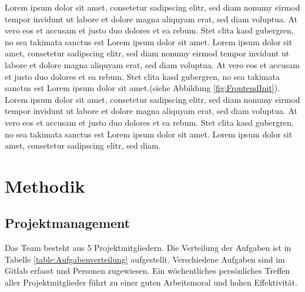 \documentclass[a4paper]{spie}  %
\begin{document}
Lorem ipsum dolor sit amet, consetetur sadipscing elitr, sed diam nonumy eirmod tempor invidunt ut labore et dolore magna aliquyam erat, sed diam voluptua. At vero eos et accusam et justo duo dolores et ea rebum. Stet clita kasd gubergren, no sea takimata sanctus est Lorem ipsum dolor sit amet. Lorem ipsum dolor sit amet, consetetur sadipscing elitr, sed diam nonumy eirmod tempor invidunt ut labore et dolore magna aliquyam erat, sed diam voluptua. At vero eos et accusam et justo duo dolores et ea rebum. Stet clita kasd gubergren, no sea takimata sanctus est Lorem ipsum dolor sit amet.(siehe Abbildung \ref{fig:FrontendInit}).
\\
Lorem ipsum dolor sit amet, consetetur sadipscing elitr, sed diam nonumy eirmod tempor invidunt ut labore et dolore magna aliquyam erat, sed diam voluptua. At vero eos et accusam et justo duo dolores et ea rebum. Stet clita kasd gubergren, no sea takimata sanctus est Lorem ipsum dolor sit amet. Lorem ipsum dolor sit amet, consetetur sadipscing elitr, sed diam.

\section{Methodik}
\subsection{Projektmanagement}
Das Team besteht aus 5 Projektmitgliedern. Die Verteilung der Aufgaben ist in Tabelle \ref{table:Aufgabenverteilung} aufgestellt.
Verschiedene Aufgaben sind im Gitlab erfasst und Personen zugewiesen. Ein wöchentliches persönliches Treffen aller Projektmitglieder führt zu einer guten Arbeitsmoral und hohen Effektivität.
\end{document}
